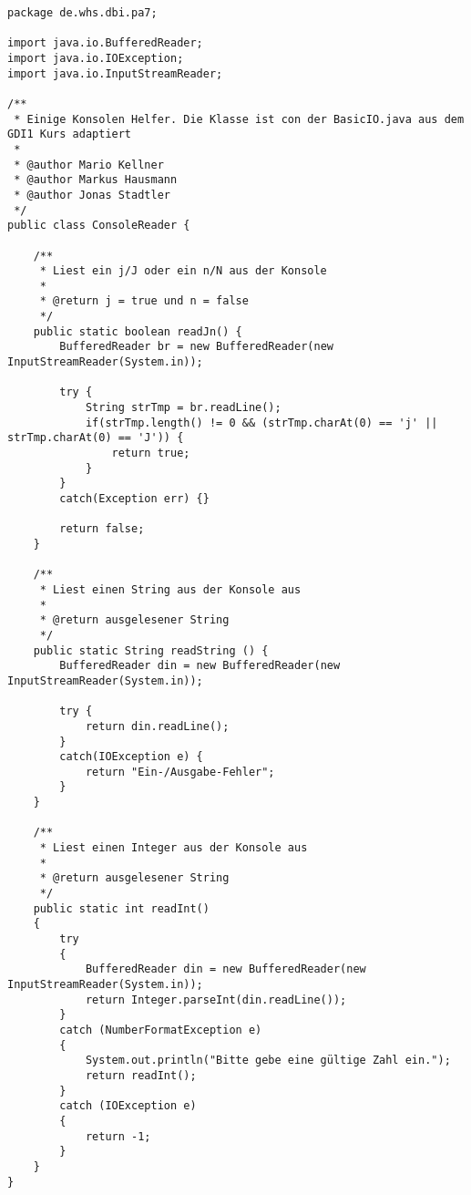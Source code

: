 \begin{lstlisting}[caption={ConsoleReader}, label={lst:crv2}]
package de.whs.dbi.pa7;

import java.io.BufferedReader;
import java.io.IOException;
import java.io.InputStreamReader;

/**
 * Einige Konsolen Helfer. Die Klasse ist con der BasicIO.java aus dem GDI1 Kurs adaptiert
 * 
 * @author Mario Kellner
 * @author Markus Hausmann
 * @author Jonas Stadtler
 */
public class ConsoleReader {
	
	/**
	 * Liest ein j/J oder ein n/N aus der Konsole
	 * 
	 * @return j = true und n = false
	 */
	public static boolean readJn() {
		BufferedReader br = new BufferedReader(new InputStreamReader(System.in));
		
		try {
			String strTmp = br.readLine();
			if(strTmp.length() != 0 && (strTmp.charAt(0) == 'j' || strTmp.charAt(0) == 'J')) {
				return true;
			}
		}
		catch(Exception err) {}
		
		return false;
	}
	
	/**
	 * Liest einen String aus der Konsole aus
	 * 
	 * @return ausgelesener String
	 */
	public static String readString () {
		BufferedReader din = new BufferedReader(new InputStreamReader(System.in)); 
		
		try {	
			return din.readLine();
		}
		catch(IOException e) {				  
			return "Ein-/Ausgabe-Fehler";
		}
	}
	
	/**
	 * Liest einen Integer aus der Konsole aus
	 * 
	 * @return ausgelesener String
	 */
	public static int readInt()
	{
		try 
		{
			BufferedReader din = new BufferedReader(new InputStreamReader(System.in));
			return Integer.parseInt(din.readLine());
		}
		catch (NumberFormatException e)
		{
			System.out.println("Bitte gebe eine gültige Zahl ein.");
			return readInt();
		}
		catch (IOException e)
		{
			return -1;
		}
	}
}
\end{lstlisting}

